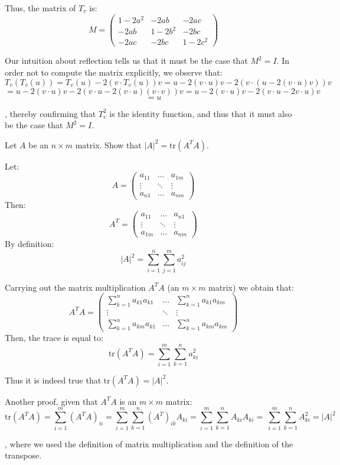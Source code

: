 \begin{solution}
    Thus, the matrix of $T_v$ is:
    $$M = \begin{pmatrix}
        1 - 2a^2 & -2ab & -2ac \\ -2ab & 1 - 2b^2 & -2bc \\ -2ac & -2bc & 1 - 2c^2
    \end{pmatrix}$$

    Our intuition about reflection tells us that it must be the case that $M^2 = I$. In order not to compute the matrix explicitly, we observe that:
    $$T_v(T_v(u)) = T_v(u) - 2(v \cdot T_v(u))v = u - 2(v \cdot u)v - 2(v \cdot (u - 2(v \cdot u)v))v $$
    $$ = u - 2(v \cdot u)v - 2(v\cdot u -2 (v \cdot u)(v \cdot v))v = u - 2(v \cdot u)v - 2(v\cdot u - 2v\cdot u)v$$
    $$ = u$$

    , thereby confirming that $T_v^2$ is the identity function, and thus that it must also be the case that $M^2 = I$.
\end{solution}

\begin{exercise}{28}
    Let $A$ be an $n \times m$ matrix. Show that $\lvert A \rvert ^2 = \text{tr}(A^TA)$.
\end{exercise}

\begin{solution}

    Let:
    $$A = \begin{pmatrix}
        a_{11} & \ldots & a_{1m} \\ \vdots & \ddots & \vdots \\ a_{n1} & \ldots & a_{nm}
    \end{pmatrix}$$
    Then:
    $$A^T = \begin{pmatrix}
        a_{11} & \ldots & a_{n1} \\ \vdots & \ddots & \vdots \\ a_{1m} & \ldots & a_{nm}
    \end{pmatrix}$$
    By definition:
    $$\lvert A \rvert^2 = \sum_{i=1}^{n} \sum_{j=1}^{m} a_{ij}^2$$

    Carrying out the matrix multiplication $A^TA$ (an $m \times m$ matrix) we obtain that:
    $$A^TA = \begin{pmatrix}
        \sum_{k=1}^{n} a_{k1}a_{k1} & \ldots & \sum_{k=1}^{n} a_{k1}a_{km} \\
        \vdots & \ddots & \vdots \\
        \sum_{k=1}^{n}a_{km}a_{k1} & \ldots & \sum_{k=1}^{n}a_{km}a_{km}
    \end{pmatrix}$$
    Then, the trace is equal to:
    $$\text{tr}(A^TA) = \sum_{i=1}^{m} \sum_{k=1}^{n} a_{ki}^2$$
    
    Thus it is indeed true that $\text{tr}(A^TA) = \lvert A \rvert^2$.

    Another proof, given that $A^TA$ is an $m \times m$ matrix:
    $$\text{tr}(A^TA) = \sum_{i=1}^{m} (A^TA)_{ii} = \sum_{i=1}^{m} \sum_{k=1}^{n} (A^T)_{ik}A_{ki} = \sum_{i=1}^{m} \sum_{k=1}^{n} A_{ki}A_{ki} = \ \sum_{i=1}^{m} \sum_{k=1}^{n} A_{ki}^2 = \lvert A \rvert^2$$

    , where we used the definition of matrix multiplication and the definition of the transpose.
\end{solution}

